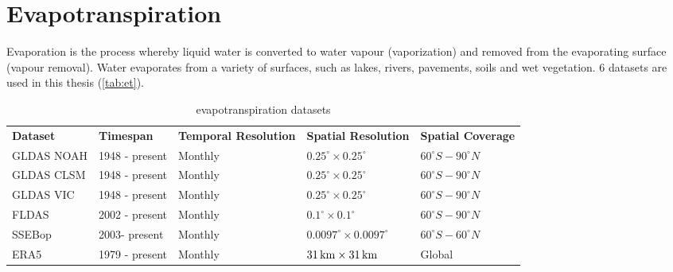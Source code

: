 \section{Evapotranspiration}
Evaporation is the process whereby liquid water is converted to water vapour (vaporization) and removed from the evaporating surface (vapour removal). Water evaporates from a variety of surfaces, such as lakes, rivers, pavements, soils and wet vegetation. 6 datasets are used in this thesis (\autoref{tab:et}). 
\begin{table}[htbp]\centering 
	\begin{tabular}{lllll}
		&                                     &                                          &                                         &                                       \\ \hline
		\multicolumn{1}{|l|}{\textbf{Dataset}}    & \multicolumn{1}{l|}{\textbf{Timespan}}       & \multicolumn{1}{l|}{\textbf{Temporal Resolution}} & \multicolumn{1}{l|}{\textbf{Spatial Resolution}} & \multicolumn{1}{l|}{\textbf{Spatial Coverage}} \\ \hline
		\multicolumn{1}{|l|}{GLDAS NOAH} & \multicolumn{1}{l|}{1948 - present} & \multicolumn{1}{l|}{Monthly}             & \multicolumn{1}{l|}{$0.25^{\circ} \times  0.25^{\circ}$}        & \multicolumn{1}{l|}{$60^{\circ}S - 90^{\circ}N$}      \\ \hline
		\multicolumn{1}{|l|}{GLDAS CLSM} & \multicolumn{1}{l|}{1948 - present} & \multicolumn{1}{l|}{Monthly}             & \multicolumn{1}{l|}{$0.25^{\circ} \times 0.25^{\circ}$}        & \multicolumn{1}{l|}{$60^{\circ}S - 90^{\circ}N$}      \\ \hline
		\multicolumn{1}{|l|}{GLDAS VIC}  & \multicolumn{1}{l|}{1948 - present} & \multicolumn{1}{l|}{Monthly}             & \multicolumn{1}{l|}{$0.25^{\circ} \times 0.25^{\circ}$}        & \multicolumn{1}{l|}{$60^{\circ}S - 90^{\circ}N$}      \\ \hline
		\multicolumn{1}{|l|}{FLDAS}      & \multicolumn{1}{l|}{2002 - present} & \multicolumn{1}{l|}{Monthly}             & \multicolumn{1}{l|}{$0.1^{\circ} \times 0.1^{\circ}$}          & \multicolumn{1}{l|}{$60^{\circ}S - 90^{\circ}N$}      \\ \hline
		\multicolumn{1}{|l|}{SSEBop}     & \multicolumn{1}{l|}{2003- present}  & \multicolumn{1}{l|}{Monthly}             & \multicolumn{1}{l|}{$0.0097^{\circ} \times 0.0097^{\circ}$}    & \multicolumn{1}{l|}{$60^{\circ}S - 60^{\circ}N$}      \\ \hline
		\multicolumn{1}{|l|}{ERA5}       & \multicolumn{1}{l|}{1979 - present} & \multicolumn{1}{l|}{Monthly}             & \multicolumn{1}{l|}{$31\,\mathrm{km} \times 31\,\mathrm{km}$}            & \multicolumn{1}{l|}{Global}           \\ \hline
	\end{tabular}
	\caption{evapotranspiration datasets}
	\label{tab:et}
\end{table}
